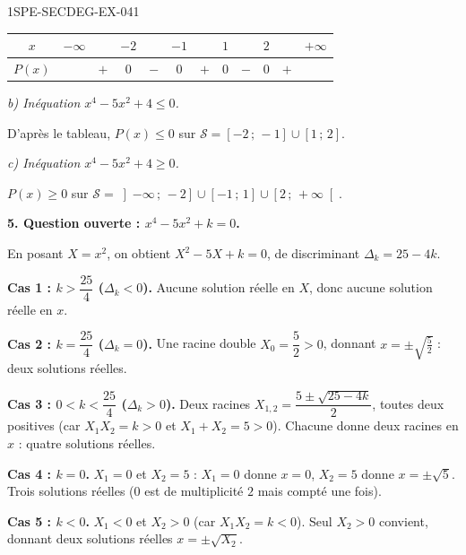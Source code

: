 \begin{corrige}{1SPE-SECDEG-EX-041}
\medskip
\begin{center}
\begin{tabular}{|c|ccccccccccc|}
\hline
$x$ & $-\infty$ & & $-2$ & & $-1$ & & $1$ & & $2$ & & $+\infty$ \\
\hline
$P(x)$ & & $+$ & $0$ & $-$ & $0$ & $+$ & $0$ & $-$ & $0$ & $+$ & \\
\hline
\end{tabular}
\end{center}

\textit{b) Inéquation $x^4 - 5x^2 + 4 \leqslant 0$.}

D'après le tableau, $P(x) \leqslant 0$ sur $\mathcal{S} = \left[-2\,;\,-1\right] \cup \left[1\,;\,2\right]$.

\textit{c) Inéquation $x^4 - 5x^2 + 4 \geqslant 0$.}

$P(x) \geqslant 0$ sur $\mathcal{S} = \left]-\infty\,;\,-2\right] \cup \left[-1\,;\,1\right] \cup \left[2\,;\,+\infty\right[$.

\medskip
\textbf{5. Question ouverte : $x^4 - 5x^2 + k = 0$.}


En posant $X = x^2$, on obtient $X^2 - 5X + k = 0$, de discriminant $\Delta_k = 25 - 4k$.

\textbf{Cas 1 : $k > \dfrac{25}{4}$ ($\Delta_k < 0$).} Aucune solution réelle en $X$, donc aucune solution réelle en $x$.

\textbf{Cas 2 : $k = \dfrac{25}{4}$ ($\Delta_k = 0$).} Une racine double $X_0 = \dfrac{5}{2} > 0$, donnant $x = \pm\sqrt{\frac{5}{2}}$ : deux solutions réelles.

\textbf{Cas 3 : $0 < k < \dfrac{25}{4}$ ($\Delta_k > 0$).} Deux racines $X_{1,2} = \dfrac{5 \pm \sqrt{25-4k}}{2}$, toutes deux positives (car $X_1 X_2 = k > 0$ et $X_1 + X_2 = 5 > 0$). Chacune donne deux racines en $x$ : quatre solutions réelles.

\textbf{Cas 4 : $k = 0$.} $X_1 = 0$ et $X_2 = 5$ : $X_1 = 0$ donne $x = 0$, $X_2 = 5$ donne $x = \pm\sqrt{5}$. Trois solutions réelles ($0$ est de multiplicité $2$ mais compté une fois).

\textbf{Cas 5 : $k < 0$.} $X_1 < 0$ et $X_2 > 0$ (car $X_1 X_2 = k < 0$). Seul $X_2 > 0$ convient, donnant deux solutions réelles $x = \pm\sqrt{X_2}$.

\end{corrige}
